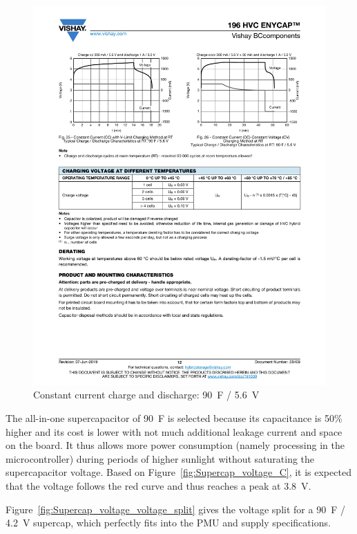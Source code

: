 \documentclass{EPL-master-thesis-covers-EN}
\begin{document}
\begin{figure}[H]
    \centering
    \includegraphics[clip, trim=1cm 18.5cm 11cm 3cm, scale=1]{196hvc-12.pdf}
    \caption{Constant current charge and discharge: \SI{90}{F} / \SI{5.6}{V}~\cite{Vishay}}
    \label{fig:hvc}
\end{figure}

The all-in-one supercapacitor of \SI{90}{F} is selected because its capacitance is 50\% higher and its cost is lower with not much additional leakage current and space on the board. It thus allows more power consumption (namely processing in the microcontroller) during periods of higher sunlight without saturating the supercapacitor voltage. Based on Figure~\ref{fig:Supercap_voltage_C}, it is expected that the voltage follows the red curve and thus reaches a peak at \SI{3.8}{V}.

Figure~\ref{fig:Supercap_voltage_voltage_split} gives the voltage split for a \SI{90}{F} / \SI{4.2}{V} supercap, which perfectly fits into the PMU and supply specifications.
\end{document}
